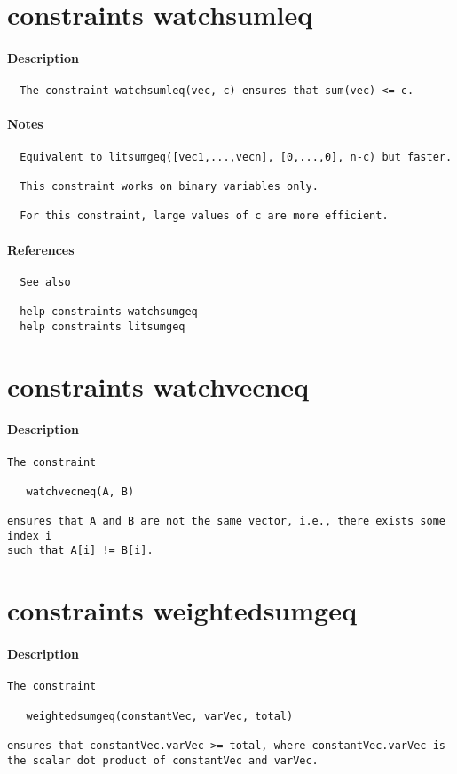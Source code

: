 \section{constraints watchsumleq}
\paragraph{Description}
{\footnotesize
\begin{verbatim}
  The constraint watchsumleq(vec, c) ensures that sum(vec) <= c.
\end{verbatim}
}
\paragraph{Notes}
{\footnotesize
\begin{verbatim}
  Equivalent to litsumgeq([vec1,...,vecn], [0,...,0], n-c) but faster.

  This constraint works on binary variables only.

  For this constraint, large values of c are more efficient.
\end{verbatim}
}
\paragraph{References}
{\footnotesize
\begin{verbatim}
  See also

  help constraints watchsumgeq
  help constraints litsumgeq
\end{verbatim}
}
\section{constraints watchvecneq}
\paragraph{Description}
{\footnotesize
\begin{verbatim}
The constraint

   watchvecneq(A, B)

ensures that A and B are not the same vector, i.e., there exists some index i
such that A[i] != B[i].
\end{verbatim}
}
\section{constraints weightedsumgeq}
\paragraph{Description}
{\footnotesize
\begin{verbatim}
The constraint

   weightedsumgeq(constantVec, varVec, total)

ensures that constantVec.varVec >= total, where constantVec.varVec is
the scalar dot product of constantVec and varVec.
\end{verbatim}
}
